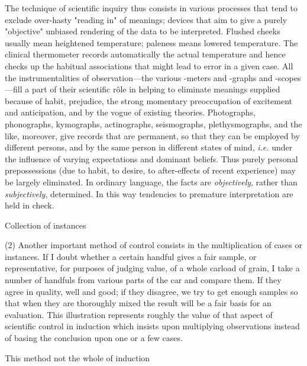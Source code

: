 \documentclass[letterpaper]{book}
\begin{document}
The technique of scientific inquiry thus consists in various processes
that tend to exclude over-hasty "reading in" of meanings; devices that
aim to give a purely "objective" unbiased rendering of the data to be
interpreted. Flushed cheeks usually mean heightened temperature;
paleness means lowered temperature. The clinical thermometer records
automatically the actual temperature and hence checks up the habitual
associations that might lead to error in a given case. All the
instrumentalities of observation---the various -meters and -graphs and
-scopes---fill a
part
of their scientific rôle in helping to eliminate meanings supplied
because of habit, prejudice, the strong momentary preoccupation of
excitement and anticipation, and by the vogue of existing theories.
Photographs, phonographs, kymographs, actinographs, seismographs,
plethysmographs, and the like, moreover, give records that are
permanent, so that they can be employed by different persons, and by the
same person in different states of mind, \emph{i.e.} under the influence
of varying expectations and dominant beliefs. Thus purely personal
prepossessions (due to habit, to desire, to after-effects of recent
experience) may be largely eliminated. In ordinary language, the facts
are \emph{objectively}, rather than \emph{subjectively}, determined. In
this way tendencies to premature interpretation are held in check.

Collection of instances

(2) Another important method of control consists in the multiplication
of cases or instances. If I doubt whether a certain handful gives a fair
sample, or representative, for purposes of judging value, of a whole
carload of grain, I take a number of handfuls from various parts of the
car and compare them. If they agree in quality, well and good; if they
disagree, we try to get enough samples so that when they are thoroughly
mixed the result will be a fair basis for an evaluation. This
illustration represents roughly the value of that aspect of scientific
control in induction which insists upon multiplying observations instead
of basing the conclusion upon one or a few cases.

This method not the whole of induction
\end{document}
